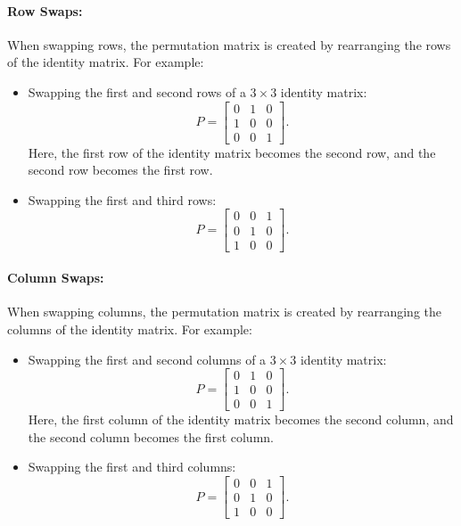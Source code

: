 \documentclass{article}
\begin{document}
\paragraph{Row Swaps:}
When swapping rows, the permutation matrix is created by rearranging the rows of the identity matrix. For example:
\begin{itemize}
    \item Swapping the first and second rows of a $3 \times 3$ identity matrix:
    \[
    P = \begin{bmatrix}
    0 & 1 & 0 \\
    1 & 0 & 0 \\
    0 & 0 & 1
    \end{bmatrix}.
    \]
    Here, the first row of the identity matrix becomes the second row, and the second row becomes the first row.

    \item Swapping the first and third rows:
    \[
    P = \begin{bmatrix}
    0 & 0 & 1 \\
    0 & 1 & 0 \\
    1 & 0 & 0
    \end{bmatrix}.
    \]
\end{itemize}

\paragraph{Column Swaps:}
When swapping columns, the permutation matrix is created by rearranging the columns of the identity matrix. For example:
\begin{itemize}
    \item Swapping the first and second columns of a $3 \times 3$ identity matrix:
    \[
    P = \begin{bmatrix}
    0 & 1 & 0 \\
    1 & 0 & 0 \\
    0 & 0 & 1
    \end{bmatrix}.
    \]
    Here, the first column of the identity matrix becomes the second column, and the second column becomes the first column.

    \item Swapping the first and third columns:
    \[
    P = \begin{bmatrix}
    0 & 0 & 1 \\
    0 & 1 & 0 \\
    1 & 0 & 0
    \end{bmatrix}.
    \]
\end{itemize}
\end{document}
